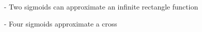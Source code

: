 - Two sigmoids can approximate an infinite rectangle function







- Four sigmoids approximate a cross






